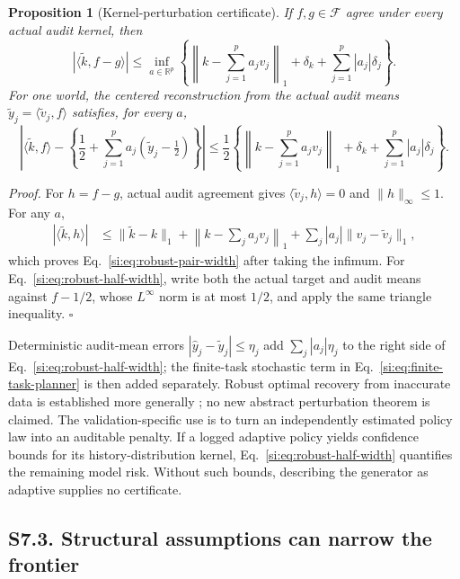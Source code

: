 \documentclass[10pt,twocolumn]{article}
\newtheorem{proposition}{Proposition}
\newcommand{\cF}{\mathcal F}
\begin{document}
\begin{proposition}[Kernel-perturbation certificate]
\label{si:prop:kernel-perturbation}
If $f,g\in\cF$ agree under every actual audit kernel, then
\begin{equation}
|\langle\widetilde k,f-g\rangle|
\le
\inf_{a\in\mathbb R^p}
\left\{
\left\|k-\sum_{j=1}^p a_jv_j\right\|_1
+\delta_k+\sum_{j=1}^p|a_j|\delta_j
\right\}.
\label{si:eq:robust-pair-width}
\end{equation}
For one world, the centered reconstruction from the actual audit means $\widetilde y_j=\langle\widetilde v_j,f\rangle$ satisfies, for every $a$,
\begin{equation}
\left|
\langle\widetilde k,f\rangle
-\left\{\frac12+\sum_{j=1}^p a_j(\widetilde y_j-\tfrac12)\right\}
\right|
\le\frac12
\left\{
\left\|k-\sum_{j=1}^p a_jv_j\right\|_1
+\delta_k+\sum_{j=1}^p|a_j|\delta_j
\right\}.
\label{si:eq:robust-half-width}
\end{equation}
\end{proposition}

\noindent\textit{Proof.}
For $h=f-g$, actual audit agreement gives $\langle\widetilde v_j,h\rangle=0$ and $\|h\|_\infty\le1$. For any $a$,
\begin{align}
|\langle\widetilde k,h\rangle|
&\le \|\widetilde k-k\|_1
+\left\|k-\sum_ja_jv_j\right\|_1
+\sum_j|a_j|\|v_j-\widetilde v_j\|_1,
\end{align}
which proves Eq.~\ref{si:eq:robust-pair-width} after taking the infimum. For Eq.~\ref{si:eq:robust-half-width}, write both the actual target and audit means against $f-1/2$, whose $L^\infty$ norm is at most $1/2$, and apply the same triangle inequality. \hfill$\square$

Deterministic audit-mean errors $|\widehat y_j-\widetilde y_j|\le\eta_j$ add $\sum_j|a_j|\eta_j$ to the right side of Eq.~\ref{si:eq:robust-half-width}; the finite-task stochastic term in Eq.~\ref{si:eq:finite-task-planner} is then added separately. Robust optimal recovery from inaccurate data is established more generally \citep{ettehad2021}; no new abstract perturbation theorem is claimed. The validation-specific use is to turn an independently estimated policy law into an auditable penalty. If a logged adaptive policy yields confidence bounds for its history-distribution kernel, Eq.~\ref{si:eq:robust-half-width} quantifies the remaining model risk. Without such bounds, describing the generator as adaptive supplies no certificate.

\subsection*{S7.3. Structural assumptions can narrow the frontier}
\end{document}
